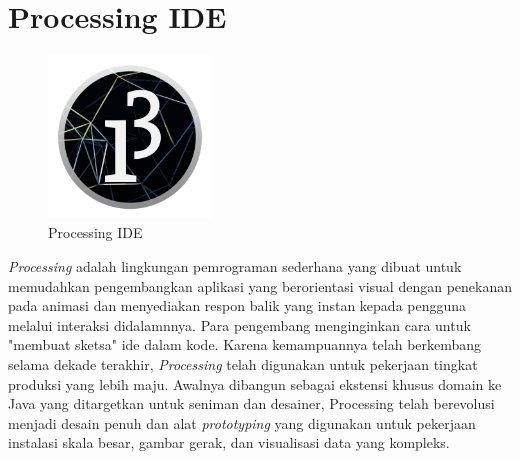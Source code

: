 \section{Processing IDE}
	\begin{figure}[H]
	\centering
	\includegraphics[width=4.33cm]{gambar/logo_processing.png}
	\caption{Processing IDE}
	\end{figure}
	\emph{Processing} adalah lingkungan pemrograman sederhana yang dibuat untuk  memudahkan pengembangkan aplikasi yang berorientasi visual dengan penekanan pada animasi dan menyediakan respon balik yang instan kepada pengguna melalui interaksi didalamnnya. Para pengembang menginginkan cara untuk "membuat sketsa" ide dalam kode. Karena kemampuannya telah berkembang selama dekade terakhir, \emph{Processing} telah digunakan untuk pekerjaan tingkat produksi yang lebih maju. Awalnya dibangun sebagai ekstensi khusus domain ke Java yang ditargetkan untuk seniman dan desainer, Processing telah berevolusi menjadi desain penuh dan alat \emph{prototyping} yang digunakan untuk pekerjaan instalasi skala besar, gambar gerak, dan visualisasi data yang kompleks.
